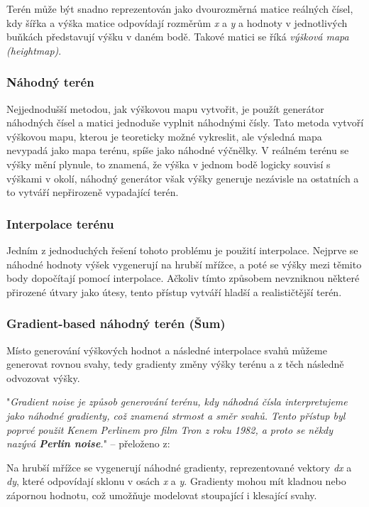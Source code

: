 Terén může být snadno reprezentován jako dvourozměrná matice reálných čísel, kdy šířka a výška matice odpovídají rozměrům \textit{x} a \textit{y} a hodnoty v jednotlivých buňkách představují výšku v daném bodě. Takové matici se říká \textit{výšková mapa (heightmap)}. \cite{NoiseClanek}

\subsubsection{Náhodný terén}

Nejjednodušší metodou, jak výškovou mapu vytvořit, je použít generátor náhodných čísel a matici jednoduše vyplnit náhodnými čísly. Tato metoda vytvoří výškovou mapu, kterou je teoreticky možné vykreslit, ale výsledná mapa nevypadá jako mapa terénu, spíše jako náhodné výčnělky. V reálném terénu se výšky mění plynule, to znamená, že výška v jednom bodě logicky souvisí s výškami v okolí, náhodný generátor však výšky generuje nezávisle na ostatních a to vytváří nepřirozeně vypadající terén. 

\subsubsection{Interpolace terénu}

Jedním z jednoduchých řešení tohoto problému je použití interpolace. Nejprve se náhodné hodnoty výšek vygenerují na hrubší mřížce, a poté se výšky mezi těmito body dopočítají pomocí interpolace. Ačkoliv tímto způsobem nevzniknou některé přirozené útvary jako útesy, tento přístup vytváří hladší a realističtější terén.

\subsubsection{Gradient-based náhodný terén (Šum)}

Místo generování výškových hodnot a následné interpolace svahů můžeme generovat rovnou svahy, tedy gradienty změny výšky terénu a z těch následně odvozovat výšky. \cite{NoiseClanek}

"\textit{Gradient noise je způsob generování terénu, kdy náhodná čísla interpretujeme jako náhodné gradienty, což znamená strmost a směr svahů. Tento přístup byl poprvé použit Kenem Perlinem pro film Tron z roku 1982, a proto se někdy nazývá \textbf{Perlin noise}.}" -- přeloženo z: \cite{PCGinG}

Na hrubší mřížce se vygenerují náhodné gradienty, reprezentované vektory \textit{dx} a \textit{dy}, které odpovídají sklonu v osách \textit{x} a \textit{y}. Gradienty mohou mít kladnou nebo zápornou hodnotu, což umožňuje modelovat stoupající i klesající svahy. 


